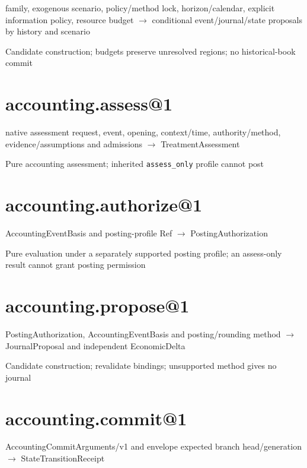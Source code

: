 family, exogenous scenario, policy/method lock, horizon/calendar, explicit information policy, resource budget \ensuremath{\rightarrow} conditional event/journal/state proposals by history and scenario

Candidate construction; budgets preserve unresolved regions; no historical-book commit

\hypertarget{accounting.assess1}{%
\section{accounting.assess@1}\label{accounting.assess1}}

native assessment request, event, opening, context/time, authority/method, evidence/assumptions and admissions \ensuremath{\rightarrow} TreatmentAssessment

Pure accounting assessment; inherited \texttt{assess\_only} profile cannot post

\hypertarget{accounting.authorize1}{%
\section{accounting.authorize@1}\label{accounting.authorize1}}

AccountingEventBasis and posting-profile Ref \ensuremath{\rightarrow} PostingAuthorization

Pure evaluation under a separately supported posting profile; an assess-only result cannot grant posting permission

\hypertarget{accounting.propose1}{%
\section{accounting.propose@1}\label{accounting.propose1}}

PostingAuthorization, AccountingEventBasis and posting/rounding method \ensuremath{\rightarrow} JournalProposal and independent EconomicDelta

Candidate construction; revalidate bindings; unsupported method gives no journal

\hypertarget{accounting.commit1}{%
\section{accounting.commit@1}\label{accounting.commit1}}

AccountingCommitArguments/v1 and envelope expected branch head/generation \ensuremath{\rightarrow} StateTransitionReceipt

